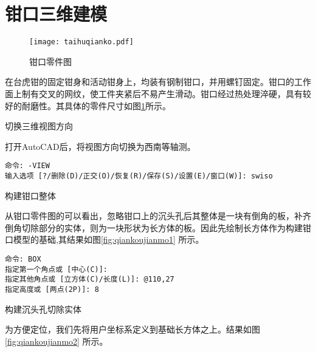 \section{钳口三维建模}

\begin{figure}[htbp]
\centering
\texttt{[image: taihuqianko.pdf]}
\caption{钳口零件图}\label{fig:taihuqianko}
\end{figure}

在台虎钳的固定钳身和活动钳身上，均装有钢制钳口，并用螺钉固定。钳口的工作面上制有交叉的网纹，使工件夹紧后不易产生滑动。钳口经过热处理淬硬，具有较好的耐磨性。其具体的零件尺寸如图\ref{fig:taihuqianko}所示。

\begin{procedure}
\item 切换三维视图方向

打开AutoCAD后，将视图方向切换为西南等轴测。

\begin{lstlisting}
命令: -VIEW
输入选项 [?/删除(D)/正交(O)/恢复(R)/保存(S)/设置(E)/窗口(W)]: swiso
\end{lstlisting}

\item 构建钳口整体

从钳口零件图的可以看出，忽略钳口上的沉头孔后其整体是一块有倒角的板，补齐倒角切除部分的实体，则为一块形状为长方体的板。因此先绘制长方体作为构建钳口模型的基础,其结果如图\ref{fig:qiankoujianmo1} 所示。

\begin{lstlisting}
命令: BOX
指定第一个角点或 [中心(C)]:
指定其他角点或 [立方体(C)/长度(L)]: @110,27
指定高度或 [两点(2P)]: 8
\end{lstlisting}

\begin{figure}[htbp]
\centering
\begin{floatrow}[2]
\end{floatrow}

\end{figure}

\item 构建沉头孔切除实体

为方便定位，我们先将用户坐标系定义到基础长方体之上。结果如图\ref{fig:qiankoujianmo2} 所示。


\end{procedure}
